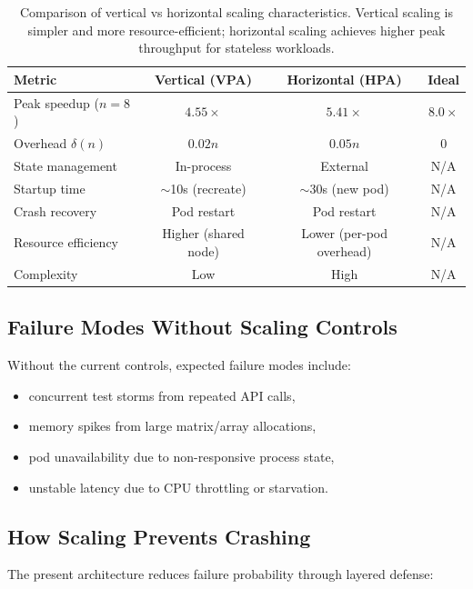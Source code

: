 \documentclass[11pt,a4paper]{article}
\begin{document}
\begin{table}[H]
\centering
\begin{tabular}{@{}lccc@{}}
\toprule
\textbf{Metric} & \textbf{Vertical (VPA)} & \textbf{Horizontal (HPA)} & \textbf{Ideal} \\
\midrule
Peak speedup ($n=8$) & $4.55\times$ & $5.41\times$ & $8.0\times$ \\
Overhead $\delta(n)$ & $0.02n$ & $0.05n$ & $0$ \\
State management & In-process & External & N/A \\
Startup time & $\sim$10s (recreate) & $\sim$30s (new pod) & N/A \\
Crash recovery & Pod restart & Pod restart & N/A \\
Resource efficiency & Higher (shared node) & Lower (per-pod overhead) & N/A \\
Complexity & Low & High & N/A \\
\bottomrule
\end{tabular}
\caption{Comparison of vertical vs horizontal scaling characteristics. Vertical scaling is simpler and more resource-efficient; horizontal scaling achieves higher peak throughput for stateless workloads.}
\label{tab:scaling-comparison}
\end{table}

\subsection{Failure Modes Without Scaling Controls}
Without the current controls, expected failure modes include:

\begin{itemize}[leftmargin=1.5em]
	\item concurrent test storms from repeated API calls,
	\item memory spikes from large matrix/array allocations,
	\item pod unavailability due to non-responsive process state,
	\item unstable latency due to CPU throttling or starvation.
\end{itemize}

\subsection{How Scaling Prevents Crashing}
The present architecture reduces failure probability through layered defense:
\end{document}
